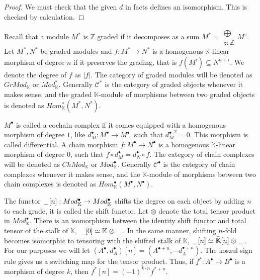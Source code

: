 \documentclass[../thesis.tex]{subfiles}
\begin{document}
            \begin{proof}
                We must check that the given $d$ in facts defines an isomorphism. This is checked by calculation. 
            \end{proof}

            Recall that a module $M^*$ is $\mathbb{Z}$ graded if it decomposes as a sum $M^* = \substack{\bigoplus \\ z:\mathbb{Z}}M^z$. Let $M^*,N^*$ be graded modules and $f:M^*\rightarrow N^*$ is a homogenous $\mathbb{K}$-linear morphism of degree $n$ if it preserves the grading, that is $f(M^i) \subseteq N^{n+i}$. We denote the degree of $f$ as $|f|$. The category of graded modules will be denoted as $GrMod_{\mathbb{K}}$ or $Mod_\mathbb{K}^*$. Generally $\mathcal{C}^*$ is the category of graded objects whenever it makes sense, and the graded $\mathbb{K}$-module of morphisms between two graded objects is denoted as $Hom_{\mathbb{K}}^*(M^*,N^*)$.
            

            $M^{\bullet}$ is called a cochain complex if it comes equipped with a homogenous morphism of degree $1$, like $d_M^{\bullet}:M^{\bullet}\rightarrow M^{\bullet}$, such that ${d_M^{\bullet}}^2=0$. This morphism is called differential. A chain morphism $f: M^{\bullet}\rightarrow N^{\bullet}$ is a homogenous $\mathbb{K}$-linear morphism of degree $0$, such that $f\circ d_M^{\bullet} = d_N^{\bullet}\circ f$. The category of chain complexes will be denoted as $ChMod_{\mathbb{K}}$ or $Mod_\mathbb{K}^\bullet$. Generally $\mathcal{C}^\bullet$ is the category of chain complexes whenever it makes sense, and the $\mathbb{K}$-module of morphisms between two chain complexes is denoted as $Hom_{\mathbb{K}}^{\bullet}(M^{\bullet},N^{\bullet})$.


            The functor $\hspace{0.05cm}\underline{\hspace{0.2cm}}\hspace{0.05cm}[n]:Mod_\mathbb{K}^\bullet\rightarrow Mod_\mathbb{K}^\bullet$ shifts the degree on each object by adding $n$ to each grade, it is called the shift functor. Let $\otimes$ denote the total tensor product in $Mod_\mathbb{K}^\bullet$. There is an isomorphism between the identity shift functor and total tensor of the stalk of $\mathbb{K}$, $\hspace{0.05cm}\underline{\hspace{0.2cm}}\hspace{0.05cm}[0] \simeq \bar{\mathbb{K}}\otimes\hspace{0.05cm}\underline{\hspace{0.2cm}}\hspace{0.05cm}$. In the same manner, shifting $n$-fold becomes isomorphic to tensoring with the shifted stalk of $\mathbb{K}$, $\hspace{0.05cm}\underline{\hspace{0.2cm}}\hspace{0.05cm}[n] \simeq \bar{\mathbb{K}}[n]\otimes\hspace{0.05cm}\underline{\hspace{0.2cm}}\hspace{0.05cm}$. For our purposes we will let $(A^\bullet, d_A^\bullet)[n] = (A^{\bullet + n}, -d_A^{\bullet + n})$. The koszul sign rule gives us a switching map for the tensor product. Thus, if $f^*:A^\bullet\rightarrow B^\bullet$ is a morphism of degree $k$, then $f^*[n] = (-1)^{k\cdot n}f^{*+n}$.
\end{document}
